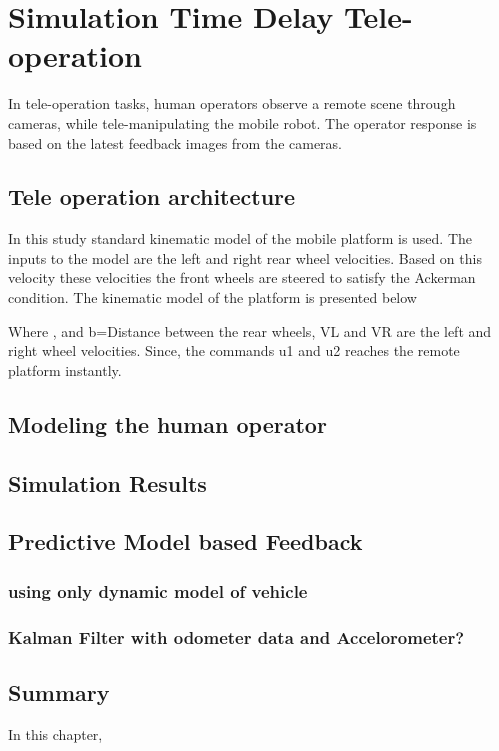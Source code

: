 
\chapter{Simulation Time Delay Tele-operation}
\label{c7_DI_equimomental}
In tele-operation tasks, human operators observe a remote scene through cameras, while tele-manipulating the mobile robot. The operator response is based on the latest feedback images from the cameras.
\section{Tele operation architecture}
In this study standard kinematic model of the mobile platform is used. The inputs to the model are the left and right rear wheel velocities. Based on this velocity these velocities the front wheels are steered to satisfy the Ackerman condition.  The kinematic model of the platform is presented below

Where , and b=Distance between the rear wheels, VL and VR are the left and right wheel velocities. Since, the commands u1 and u2 reaches the remote platform instantly.
\section{Modeling the human operator}
\section{Simulation Results }
\section{Predictive Model based Feedback}
\subsection{using only dynamic model of vehicle}
\subsection{Kalman Filter with odometer data and Accelorometer?}


\section{Summary}
In this chapter, 